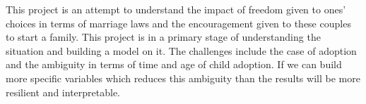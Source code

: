 \documentclass[11pt, a4paper, leqno]{article}
\begin{document}
This project is an attempt to understand the impact of freedom given to ones' choices in terms of marriage laws and the encouragement given to
these couples to start a family. This project is in a primary stage of understanding the situation and building a model on it. The challenges
include the case of adoption and the ambiguity in terms of time and age of child adoption. If we can build more specific variables which reduces
this ambiguity than the results will be more resilient and interpretable.


\clearpage
{}
\nocite{*}
\printbibliography
{}



\end{document}
